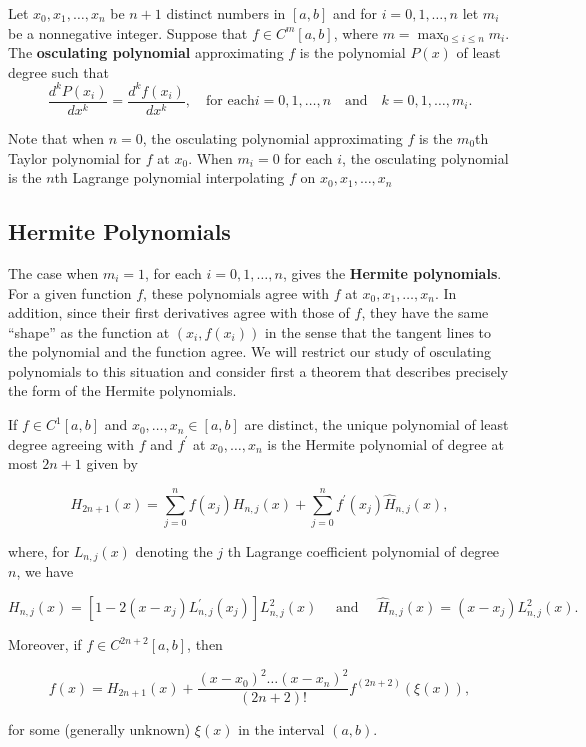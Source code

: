 \begin{definition}
 Let $x_0, x_1, \ldots, x_n$ be $n + 1$ distinct numbers in $[a,b]$ and for $i = 0, 1, \ldots, n$ let $m_i$ be a  nonnegative integer. Suppose that $f\in C^m[a,b]$, where $m =\max_{0\leq i\leq n} m_i$. The {\bf osculating polynomial} approximating $f$ is the polynomial $P(x)$ of least degree such that
\[\frac{d^kP(x_i)}{dx^k}=\frac{d^kf(x_i)}{dx^k},\quad\mbox{for each} i = 0, 1, \ldots, n\quad \mbox{and}\quad k = 0, 1, \ldots, m_i.\]
\end{definition}

Note that when $n = 0$, the osculating polynomial approximating $f$ is the $m_0$th Taylor polynomial for $f$ at $x_0$. When $m_i = 0$ for each $i$, the osculating polynomial is the $n$th Lagrange polynomial interpolating $f$ on $x_0, x_1, \ldots, x_n$

\subsection*{ Hermite Polynomials}\label{thm:hermite1}
The case when $m_i = 1$, for each $i = 0, 1, \ldots, n$, gives the {\bf Hermite polynomials}. For a given function $f$, these polynomials agree with $f$ at $x_0, x_1, \ldots, x_n$. In addition, since their first derivatives agree with those of $f$, they have the same ``shape'' as the function at $(x_i, f(x_i))$ in the sense that the tangent lines to the polynomial and the function agree. We will restrict our study of osculating polynomials to this situation and consider first a theorem that describes precisely the form of the Hermite polynomials.

\begin{theorem}\label{Hermitthm1}
If $f \in C^{1}[a, b]$ and $x_{0}, \ldots, x_{n} \in[a, b]$ are distinct, the unique polynomial of least degree agreeing with $f$ and $f^{\prime}$ at $x_{0}, \ldots, x_{n}$ is the Hermite polynomial of degree at most $2 n+1$ given by

$$
H_{2 n+1}(x)=\sum_{j=0}^{n} f\left(x_{j}\right) H_{n, j}(x)+\sum_{j=0}^{n} f^{\prime}\left(x_{j}\right) \hat{H}_{n, j}(x),
$$

where, for $L_{n, j}(x)$ denoting the $j$ th Lagrange coefficient polynomial of degree $n$, we have

$$
H_{n, j}(x)=\left[1-2\left(x-x_{j}\right) L_{n, j}^{\prime}\left(x_{j}\right)\right] L_{n, j}^{2}(x) \quad \text { and } \quad \hat{H}_{n, j}(x)=\left(x-x_{j}\right) L_{n, j}^{2}(x) .
$$

Moreover, if $f \in C^{2 n+2}[a, b]$, then

$$
f(x)=H_{2 n+1}(x)+\frac{\left(x-x_{0}\right)^{2} \ldots\left(x-x_{n}\right)^{2}}{(2 n+2)!} f^{(2 n+2)}(\xi(x)),
$$

for some (generally unknown) $\xi(x)$ in the interval $(a, b)$.
\end{theorem}

